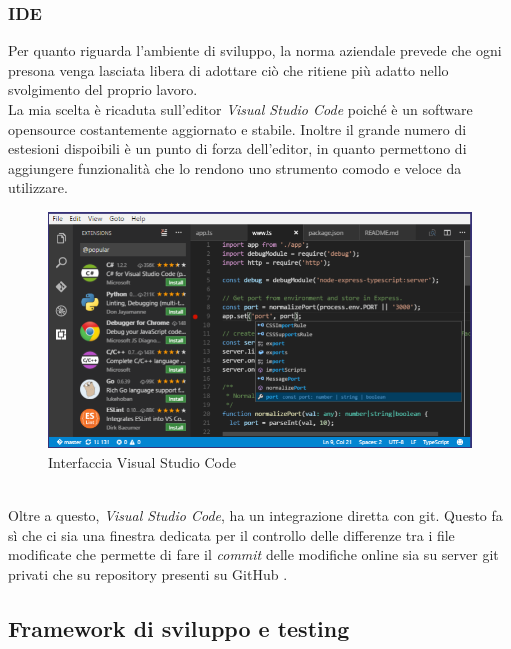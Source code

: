 \subsubsection{IDE}
Per quanto riguarda l'ambiente di sviluppo, la norma aziendale prevede che ogni presona venga lasciata libera di adottare ciò che ritiene più adatto nello svolgimento del proprio lavoro.\\
La mia scelta è ricaduta sull'editor \textit{Visual Studio Code} poiché è un software \gls{opensource} costantemente aggiornato e stabile. Inoltre il grande numero di estesioni dispoibili è un punto di forza dell'editor, in quanto permettono di aggiungere funzionalità che lo rendono uno strumento comodo e veloce da utilizzare.
\begin{figure}[h]
	\centering
	\includegraphics[scale=0.5]{immagini/vsc_interface}
	\caption{Interfaccia Visual Studio Code}
\end{figure}
\\
Oltre a questo, \textit{Visual Studio Code}, ha un integrazione diretta con \gls{git}. Questo fa sì che ci sia una finestra dedicata per il controllo delle differenze tra i file modificate che permette di fare il \textit{commit} delle modifiche online sia su server \gls{git} privati che su \gls{repository} presenti su GitHub \cite{gitGuida} \cite{gitSite}.
\subsection{Framework di sviluppo e testing}
